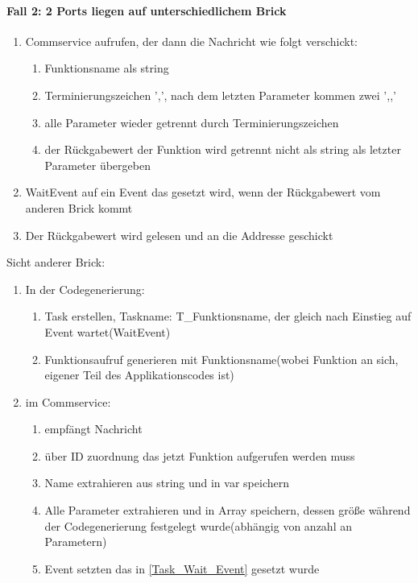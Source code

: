 \documentclass[]{scrartcl}
\begin{document}
\paragraph{Fall 2: 2 Ports liegen auf unterschiedlichem Brick}
\begin{enumerate}[1.]
\item Commservice aufrufen, der dann die Nachricht wie folgt verschickt:
	\begin{enumerate}[.1]
	\item Funktionsname als string
	\item Terminierungszeichen ',', nach dem letzten Parameter kommen zwei ',,' 
	\item alle Parameter wieder getrennt durch Terminierungszeichen
	\item der Rückgabewert der Funktion wird getrennt nicht als string als letzter Parameter übergeben
	\end{enumerate}
\item WaitEvent auf ein Event das gesetzt wird, wenn der Rückgabewert vom anderen Brick kommt
\item Der Rückgabewert wird gelesen und an die Addresse geschickt
\end{enumerate}
Sicht anderer Brick:
\begin{enumerate}
\item In der Codegenerierung:
	\begin{enumerate}[.1]
	\item Task erstellen, Taskname: T\_Funktionsname, der gleich nach Einstieg auf Event wartet(WaitEvent)
		\label{Task_Wait_Event}
	\item Funktionsaufruf generieren mit Funktionsname(wobei Funktion an sich, eigener Teil des Applikationscodes ist)
	\end{enumerate}
\item im Commservice:
	\begin{enumerate}[.1]
	\item empfängt Nachricht
	\item über ID zuordnung das jetzt Funktion aufgerufen werden muss
	\item Name extrahieren aus string und in var speichern
	\item Alle Parameter extrahieren und in Array speichern, dessen größe während der Codegenerierung festgelegt wurde(abhängig von anzahl an Parametern)
	\item Event setzten das in \ref{Task_Wait_Event} gesetzt wurde	
	\end{enumerate}
\end{enumerate}
\end{document}

